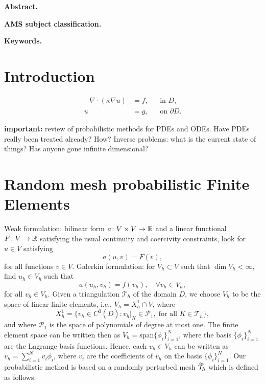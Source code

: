 \documentclass[10pt]{article}
\begin{document}
\maketitle	

\textbf{Abstract.}

\textbf{AMS subject classification.}

\textbf{Keywords.}

\section{Introduction}

\todo \cite{AbG20, KeH16, KSH18, CCC16, CGS17}

\begin{equation}\label{eq:ellipticEquation}
\begin{aligned}
	-\nabla \cdot (\kappa \nabla u) &= f, &&\text{in } D,\\
	u &= g, &&\text{on } \partial D.
\end{aligned}
\end{equation}

\textbf{important:} review of probabilistic methods for PDEs and ODEs. Have PDEs really been treated already? How? Inverse problems: what is the current state of things? Has anyone gone infinite dimensional?

\section{Random mesh probabilistic Finite Elements} 

Weak formulation: bilinear form $a\colon V\times V \to \mathbb{R}$ and a linear functional $F\colon V \to \mathbb{R}$ satisfying the usual continuity and coercivity constraints, look for $u \in V$ satisfying
\begin{equation}\label{eq:EXSol}
	a(u, v) = F(v),	
\end{equation}
for all functions $v \in V$. Galerkin formulation: for $V_h \subset V$ such that $\dim V_h < \infty$, find $u_h \in V_h$ such that
\begin{equation}\label{eq:FEMSol}
	a(u_h, v_h) = f(v_h), \quad \forall v_h \in V_h,
\end{equation}
for all $v_h \in V_h$. Given a triangulation $\mathcal T_h$ of the domain $D$, we choose $V_h$ to be the space of linear finite elements, i.e., $V_h = X_h^1 \cap V$, where 
\begin{equation}
	X_h^1 = \{v_h \in C^0(\overline D) \colon v_h|_{K} \in \mathcal P_1, \; \text{for all } K \in \mathcal T_h\},
\end{equation}
and where $\mathcal P_1$ is the space of polynomials of degree at most one. The finite element space can be written then as $V_h = \mathrm{span}\{\phi_i\}_{i=1}^N$, where the basis $\{\phi_i\}_{i=1}^N$ are the Lagrange basis functions. Hence, each $v_h \in V_h$ can be written as $v_h = \sum_{i=1}^N v_i \phi_i$, where $v_i$ are the coefficients of $v_h$ on the basis $\{\phi_i\}_{i=1}^N$. Our probabilistic method is based on a randomly perturbed mesh $\widetilde {\mathcal T}_h$ which is defined as follows.
\end{document}
